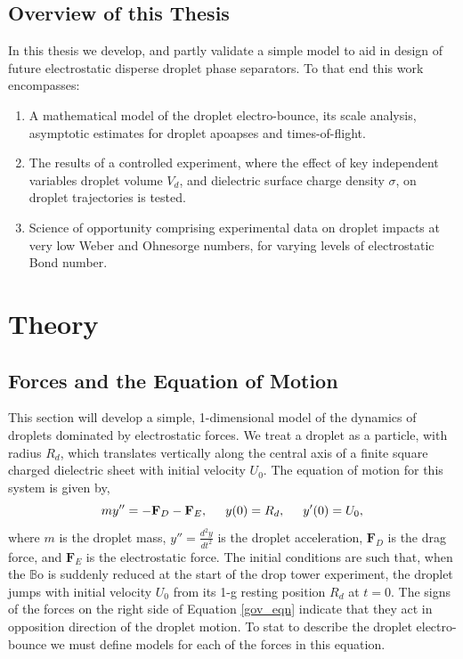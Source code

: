 \documentclass[12pt,a4paper,oneside]{book}
\begin{document}
\section{Overview of this Thesis}
In this thesis we develop, and partly validate a simple model to aid in design of future electrostatic disperse droplet phase separators. To that end this work encompasses:
\begin{enumerate}
\item A mathematical model of the droplet electro-bounce, its scale analysis, asymptotic estimates for droplet apoapses and times-of-flight.
\item The results of a controlled experiment, where the effect of key independent variables droplet volume $V_d$, and dielectric surface charge density $\sigma$, on droplet trajectories is tested.
\item Science of opportunity comprising experimental data on droplet impacts at very low Weber and Ohnesorge numbers, for varying levels of electrostatic Bond number. 
\end{enumerate}

\chapter{Theory}
\section{Forces and the Equation of Motion}
This section will develop a simple, 1-dimensional model of the dynamics of droplets dominated by electrostatic forces. We treat a droplet as a particle, with radius $R_d$, which translates vertically along the central axis of a finite square charged dielectric sheet with initial velocity $U_0$. The equation of motion for this system is given by,
\begin{equation}
m y'' = - \mathbf{F}_D - \mathbf{F}_E, \hspace{5 mm} y(0) = R_d, \hspace{5 mm} y'(0) = U_0,
\label{gov_eqn}
\end{equation}
where $m$ is the droplet mass, $y'' = \frac{d^2 y}{d t^2}$ is the droplet acceleration, $\mathbf{F}_D$ is the drag force, and $\mathbf{F}_E$ is the electrostatic force. The initial conditions are such that, when the $\mathbb{B}\mbox{o}$ is suddenly reduced at the start of the drop tower experiment, the droplet jumps with initial velocity $U_0$ from its 1-g resting position $R_d$ at $t=0$. The signs of the forces on the right side of Equation \ref{gov_eqn} indicate that they act in opposition direction of the droplet motion. To stat to describe the droplet electro-bounce we must define models for each of the forces in this equation.
\end{document}

